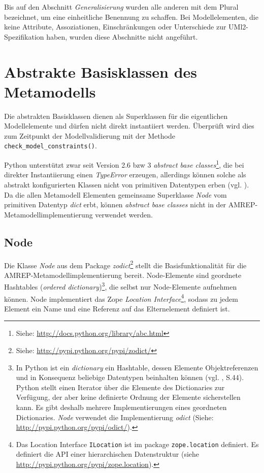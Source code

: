 Bis auf den Abschnitt \emph{Generalisierung} wurden alle anderen mit dem Plural bezeichnet, um eine einheitliche Benennung zu schaffen. Bei Modellelementen, die keine Attribute, Assoziationen, Einschränkungen oder Unterschiede zur UMl2-Spezifikation haben, wurden diese Abschnitte nicht angeführt.




\section{Abstrakte Basisklassen des Metamodells}\label{amrep-meta-abstrakt}
Die abstrakten Basisklassen dienen als Superklassen für die eigentlichen Modellelemente und dürfen nicht direkt instantiiert werden. Überprüft wird dies zum Zeitpunkt der Modellvalidierung mit der Methode \texttt{check\_model\_constraints()}.

Python unterstützt zwar seit Version 2.6 bzw 3 \emph{abstract base classes}\footnote{Siehe: \url{http://docs.python.org/library/abc.html}}, die bei direkter Instantiierung einen \emph{TypeError} erzeugen, allerdings können solche als abstrakt konfigurierten Klassen nicht von primitiven Datentypen erben (vgl. \citep{Bug1}). Da die allen Metamodell Elementen gemeinsame Superklasse \emph{Node} vom primitiven Datentyp \emph{dict} erbt, können \emph{abstract base classes} nicht in der AMREP-Metamodellimplementierung verwendet werden.


\subsection{Node}
Die Klasse \emph{Node} aus dem Package \emph{zodict}\footnote{Siehe: \url{http://pypi.python.org/pypi/zodict/}}
stellt die Basisfunktionalität für die AMREP-Metamodellimplementierung bereit. Node-Elemente sind geordnete Hashtables (\emph{ordered dictionary})\footnote{In Python ist ein \emph{dictionary} ein Hashtable, dessen Elemente Objektreferenzen und in Konsequenz beliebige Datentypen beinhalten können (vgl. \citep{Martelli2006}, S.44). Python stellt einen Iterator über die Elemente des Dictionaries zur Verfügung, der aber keine definierte Ordnung der Elemente sicherstellen kann. Es gibt deshalb mehrere Implementierungen eines geordneten Dictionaries. \emph{Node} verwendet die Implementierung \emph{odict} (Siehe: \url{http://pypi.python.org/pypi/odict/}).},
die selbst nur Node-Elemente aufnehmen können. Node implementiert das Zope \emph{Location Interface}\footnote{Das Location Interface \texttt{ILocation} ist im package \texttt{zope.location} definiert. Es definiert die API einer hierarchischen Datenstruktur (siehe \url{http://pypi.python.org/pypi/zope.location}).},
sodass zu jedem Element ein Name und eine Referenz auf das Elternelement definiert ist.

